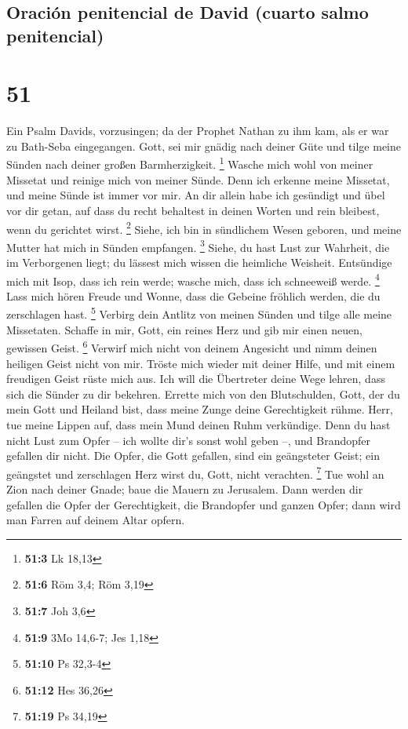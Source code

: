 \hypertarget{oraciuxf3n-penitencial-de-david-cuarto-salmo-penitencial}{%
\subsection{Oración penitencial de David (cuarto salmo
penitencial)}\label{oraciuxf3n-penitencial-de-david-cuarto-salmo-penitencial}}

\hypertarget{section-50}{%
\section{51}\label{section-50}}

 Ein Psalm Davids, vorzusingen;  da der
Prophet Nathan zu ihm kam, als er war zu Bath-Seba eingegangen.
 Gott, sei mir gnädig nach deiner Güte und tilge meine
Sünden nach deiner großen Barmherzigkeit. \footnote{\textbf{51:3} Lk
  18,13}  Wasche mich wohl von meiner Missetat und reinige
mich von meiner Sünde.  Denn ich erkenne meine Missetat,
und meine Sünde ist immer vor mir.  An dir allein habe ich
gesündigt und übel vor dir getan, auf dass du recht behaltest in deinen
Worten und rein bleibest, wenn du gerichtet wirst. \footnote{\textbf{51:6}
  Röm 3,4; Röm 3,19}  Siehe, ich bin in sündlichem Wesen
geboren, und meine Mutter hat mich in Sünden empfangen. \footnote{\textbf{51:7}
  Joh 3,6}  Siehe, du hast Lust zur Wahrheit, die im
Verborgenen liegt; du lässest mich wissen die heimliche Weisheit.
 Entsündige mich mit Isop, dass ich rein werde; wasche
mich, dass ich schneeweiß werde. \footnote{\textbf{51:9} 3Mo 14,6-7; Jes
  1,18}  Lass mich hören Freude und Wonne, dass die
Gebeine fröhlich werden, die du zerschlagen hast. \footnote{\textbf{51:10}
  Ps 32,3-4}  Verbirg dein Antlitz von meinen Sünden und
tilge alle meine Missetaten.  Schaffe in mir, Gott, ein
reines Herz und gib mir einen neuen, gewissen Geist. \footnote{\textbf{51:12}
  Hes 36,26}  Verwirf mich nicht von deinem Angesicht und
nimm deinen heiligen Geist nicht von mir.  Tröste mich
wieder mit deiner Hilfe, und mit einem freudigen Geist rüste mich aus.
 Ich will die Übertreter deine Wege lehren, dass sich die
Sünder zu dir bekehren.  Errette mich von den
Blutschulden, Gott, der du mein Gott und Heiland bist, dass meine Zunge
deine Gerechtigkeit rühme.  Herr, tue meine Lippen auf,
dass mein Mund deinen Ruhm verkündige.  Denn du hast
nicht Lust zum Opfer -- ich wollte dir's sonst wohl geben --, und
Brandopfer gefallen dir nicht.  Die Opfer, die Gott
gefallen, sind ein geängsteter Geist; ein geängstet und zerschlagen Herz
wirst du, Gott, nicht verachten. \footnote{\textbf{51:19} Ps 34,19}
 Tue wohl an Zion nach deiner Gnade; baue die Mauern zu
Jerusalem.  Dann werden dir gefallen die Opfer der
Gerechtigkeit, die Brandopfer und ganzen Opfer; dann wird man Farren auf
deinem Altar opfern.


